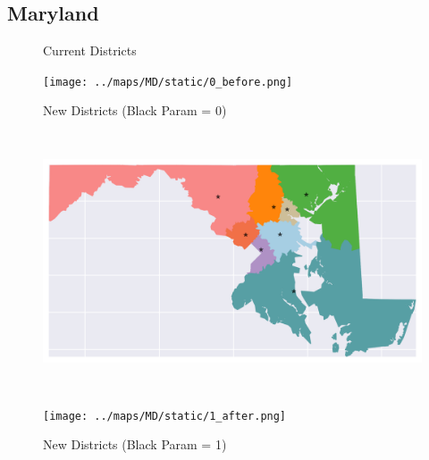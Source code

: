 \subsection{Maryland}
\begin{figure}[htb!] \centering
\caption{ Current Districts }
\texttt{[image: ../maps/MD/static/0\_before.png]}
\caption{ New Districts (Black Param = 0) }
\includegraphics[width=5in,height=3in,keepaspectratio]{../maps/MD/static/0_after.png}
\caption{ New Districts (Black Param = 1) }
\texttt{[image: ../maps/MD/static/1\_after.png]}
\end{figure}

\clearpage
\newpage

